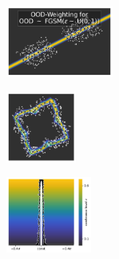 \begin{figure}[H]
    \begin{subfigure}
        \centering
        \includegraphics[width=0.388\textwidth,valign=t]{ood-detection/figures/ood-synthesis/ood-line-uniform-fgsm-weighted.pdf}
    \end{subfigure}
    \begin{subfigure}
        \centering
        \includegraphics[width=0.254\textwidth,valign=t]{ood-detection/figures/ood-synthesis/ood-circle-uniform-fgsm-weighted.pdf}
    \end{subfigure}
    \begin{subfigure}
        \centering
        \includegraphics[width=0.308\textwidth,valign=t]{ood-detection/figures/ood-synthesis/ood-haystack-uniform-fgsm-weighted.pdf}
    \end{subfigure}


\end{figure}
